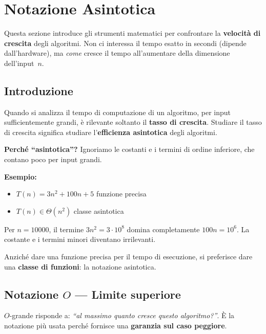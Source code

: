 \section{Notazione Asintotica}

\begin{softnote}
	Questa sezione introduce gli strumenti matematici per confrontare
	la \textbf{velocità di crescita} degli algoritmi. Non ci interessa
	il tempo esatto in secondi (dipende dall'hardware), ma \textit{come}
	cresce il tempo all'aumentare della dimensione dell'input~$n$.
\end{softnote}

\subsection{Introduzione}

Quando si analizza il tempo di computazione di un algoritmo, per input
sufficientemente grandi, è rilevante soltanto il \textbf{tasso di crescita}.
Studiare il tasso di crescita significa studiare
l'\textbf{efficienza asintotica} degli algoritmi.

\begin{nota}
	\textbf{Perché ``asintotica''?} Ignoriamo le costanti e i termini
	di ordine inferiore, che contano poco per input grandi.
	
	\textbf{Esempio:}
	\begin{itemize}
		\item $T(n) = 3n^2 + 100n + 5$ \quad funzione precisa
		\item $T(n) \in \Theta(n^2)$ \quad classe asintotica
	\end{itemize}
	Per $n = 10000$, il termine $3n^2 = 3\cdot10^8$ domina
	completamente $100n = 10^6$. La costante e i termini minori
	diventano irrilevanti.
\end{nota}

Anziché dare una funzione precisa per il tempo di esecuzione,
si preferisce dare una \textbf{classe di funzioni}: la notazione asintotica.

\subsection{Notazione \texorpdfstring{$O$}{O} — Limite superiore}

\begin{softnote}
	$O$-grande risponde a: \textit{``al massimo quanto cresce questo
		algoritmo?''}. È la notazione più usata perché fornisce una
	\textbf{garanzia sul caso peggiore}.
\end{softnote}

